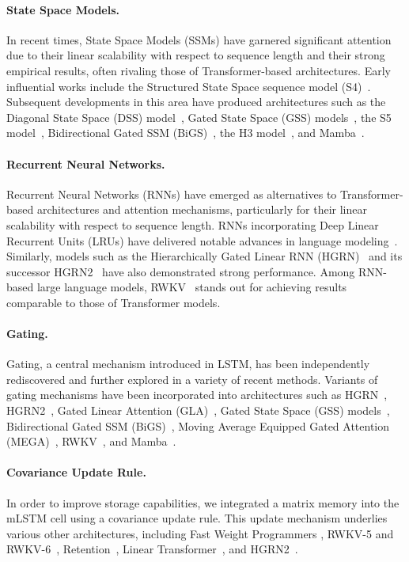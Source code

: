 \paragraph{State Space Models.} In recent times, State Space Models (SSMs) have garnered significant attention due to their linear scalability with respect to sequence length and their strong empirical results, often rivaling those of Transformer-based architectures. Early influential works include the Structured State Space sequence model (S4)~\citep{Gu:21}. Subsequent developments in this area have produced architectures such as the Diagonal State Space (DSS) model~\citep{Gupta:22}, Gated State Space (GSS) models~\citep{Mehta:22}, the S5 model~\citep{Smith:22}, Bidirectional Gated SSM (BiGS)~\citep{Wang:22}, the H3 model~\citep{Fu:23}, and Mamba~\citep{Gu:24arxiv}.

\paragraph{Recurrent Neural Networks.} Recurrent Neural Networks (RNNs) have emerged as alternatives to Transformer-based architectures and attention mechanisms, particularly for their linear scalability with respect to sequence length. RNNs incorporating Deep Linear Recurrent Units (LRUs) have delivered notable advances in language modeling~\citep{Orvieto:23, De:24arxiv}. Similarly, models such as the Hierarchically Gated Linear RNN (HGRN)~\citep{Qin:23} and its successor HGRN2~\citep{Qin:24arxiv} have also demonstrated strong performance. Among RNN-based large language models, RWKV~\citep{Peng:23arxivshort,Peng:24arxivshort} stands out for achieving results comparable to those of Transformer models.

\paragraph{Gating.}
Gating, a central mechanism introduced in LSTM, has been independently rediscovered and further explored in a variety of recent methods. Variants of gating mechanisms have been incorporated into architectures such as HGRN~\citep{Qin:23}, HGRN2~\citep{Qin:24arxiv}, Gated Linear Attention (GLA)~\citep{Yang:23arxiv}, Gated State Space (GSS) models~\citep{Mehta:22}, Bidirectional Gated SSM (BiGS)~\citep{Wang:22}, Moving Average Equipped Gated Attention (MEGA)~\citep{Ma:22}, RWKV~\citep{Peng:23arxivshort}, and Mamba~\citep{Gu:24arxiv}.

\paragraph{Covariance Update Rule.} In order to improve storage capabilities, we integrated a matrix memory into the mLSTM cell using a covariance update rule. This update mechanism underlies various other architectures, including Fast Weight Programmers \citep{Schmidhuber:92ncfastweights,Schlag:21}, RWKV-5 and RWKV-6~\citep{Peng:24arxivshort}, Retention~\citep{Sun:23arxiv}, Linear Transformer~\citep{Katharopoulos:20}, and HGRN2~\citep{Qin:24arxiv}.

